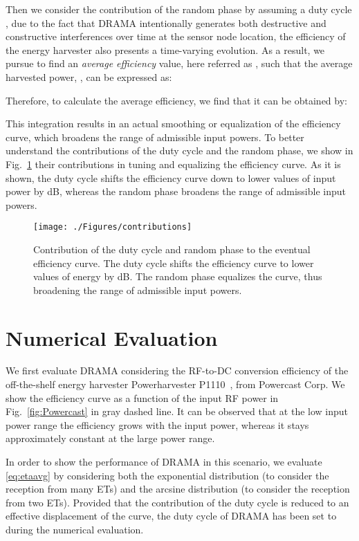 \documentclass[conference]{IEEEtran}
\begin{document}
Then we consider the contribution of the random phase by assuming a duty cycle , due to the fact that DRAMA intentionally generates both destructive and constructive interferences over time at the sensor node location, the efficiency of the energy harvester also presents a time-varying evolution. As a result, we pursue to find an \emph{average efficiency} value, here referred as , such that the average harvested power, , can be expressed as:

Therefore, to calculate the average efficiency, we find that it can be obtained by:

This integration results in an actual smoothing or equalization of the efficiency curve, which broadens the range of admissible input powers.
To better understand the contributions of the duty cycle and the random phase, we show in Fig.~\ref{fig:contributions} their contributions in tuning and equalizing the efficiency curve.
As it is shown, the duty cycle shifts the efficiency curve down to lower values of input power by  dB, whereas  the random phase broadens the range of admissible input powers.

\begin{figure}
  \centering
    \texttt{[image: ./Figures/contributions]}
 \caption{Contribution of the duty cycle and random phase to the eventual efficiency curve. The duty cycle shifts the efficiency curve to lower values of energy by  dB. The random phase equalizes the curve, thus broadening the range of admissible input powers.}
 \label{fig:contributions}
 \vspace{0.0 cm}
\end{figure}


\section{Numerical Evaluation}
We first evaluate DRAMA considering the RF-to-DC conversion efficiency of the off-the-shelf energy harvester Powerharvester P1110~\cite{P1110}, from Powercast Corp.
We show the efficiency curve as a function of the input RF power in Fig.~\ref{fig:Powercast} in gray dashed line. It can be observed that at the low input power range the efficiency grows with the input power, whereas it stays approximately constant at the large power range.

In order to show the performance of DRAMA in this scenario, we evaluate \eqref{eq:etaavg} by considering both the exponential distribution (to consider the reception from many ETs) and the arcsine distribution (to consider the reception from two ETs). Provided that the contribution of the duty cycle is reduced to an effective displacement of the curve, the duty cycle of DRAMA has been set to  during the numerical evaluation.
\end{document}
